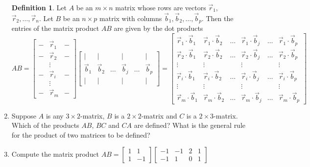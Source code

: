 \documentclass[12pt]{amsart}
\theoremstyle{definition}
\newtheorem*{definition}{Definition}
\begin{document}
\begin{enumerate}[itemsep=0.8em,leftmargin=0pt]
\begin{definition}\label{def:matmatproduct} Let $A$ be an $m\times n$ matrix whose rows are vectors $\vec{r}_1$, $\vec{r}_2,\ldots ,\vec{r}_n$.  Let $B$ be an $n\times p$ matrix with columns $\vec{b}_1, \vec{b}_2, \ldots, \vec{b}_p$.  Then the entries of the matrix product $AB$ are given by the dot products
\[AB=\begin{bmatrix}-&\vec{r}_1&-\\-&\vec{r}_2&-\\ &\vdots & \\-&\vec{r}_i &-\\ &\vdots& \\-&\vec{r}_m&-\end{bmatrix}
\begin{bmatrix}|&|&&|&&|\\\vec{b}_1& \vec{b}_2 &\ldots  & \vec{b}_j&\ldots& \vec{b}_p\\|&|&&|&&|\end{bmatrix}=
\begin{bmatrix}\vec{r}_1\cdot \vec{b}_1&\vec{r}_1\cdot \vec{b}_2&\ldots&\vec{r}_1\cdot \vec{b}_j&\ldots &\vec{r}_1\cdot \vec{b}_p\\\vec{r}_2\cdot \vec{b}_1&\vec{r}_2\cdot \vec{b}_2&\ldots&\vec{r}_2\cdot \vec{b}_j&\ldots &\vec{r}_2\cdot \vec{b}_p\\\vdots&\vdots&&\vdots&&\vdots\\\vec{r}_i\cdot \vec{b}_1&\vec{r}_i\cdot \vec{b}_2&\ldots&\vec{r}_i\cdot \vec{b}_j&\ldots &\vec{r}_i\cdot \vec{b}_p\\\vdots&\vdots&&\vdots&&\vdots\\\vec{r}_m\cdot \vec{b}_1&\vec{r}_m\cdot \vec{b}_2&\ldots&\vec{r}_m\cdot \vec{b}_j&\ldots &\vec{r}_m\cdot \vec{b}_p
\end{bmatrix}
\]
\end{definition}


\item Suppose $A$ is any $3\times 2$-matrix, $B$ is a $2\times 2$-matrix and $C$ is a $2\times 3$-matrix. Which of the products $AB$, $BC$ and $CA$ are defined? What is the general rule for the product of two matrices to be defined?


\item Compute the matrix product
$
AB = \left [  \begin{matrix} 
1 & 1 \\
1 & -1
\end{matrix} \right ] \left [ \begin{matrix}
-1 & -1 & 2 & 1 \\
-1 & 1 & 0 & 1
\end{matrix} \right ]
$


\end{enumerate}
\end{document}
